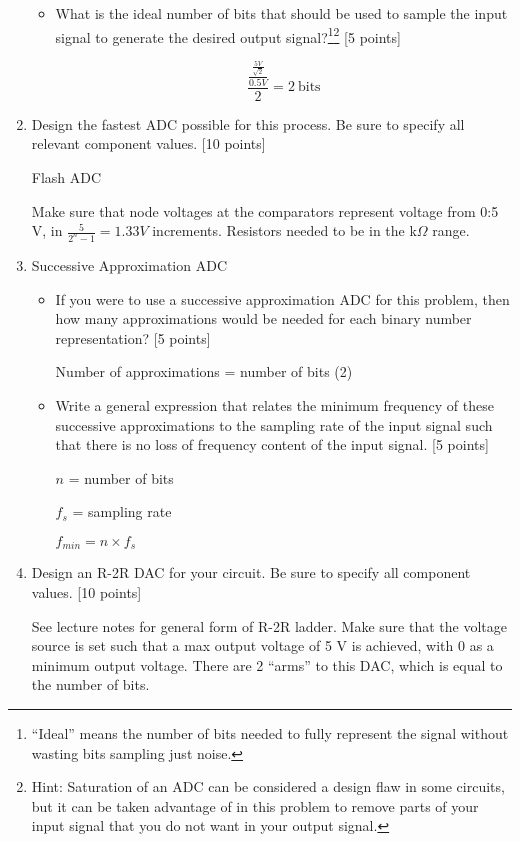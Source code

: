\begin{enumerate}
\begin{itemize}
    \item What is the ideal number of bits that should be used
to sample the input signal to generate the desired output
signal?\footnote{``Ideal'' means the number of bits needed to fully represent
the signal without wasting bits sampling just noise.}\footnote{Hint: Saturation
of an ADC can be considered a design flaw in some circuits, but it can be taken
advantage of in this problem to remove parts of your input signal that you do
not want in your output signal.} [5 points]

$$\frac{\frac{\frac{5 V}{\sqrt{2}}}{0.5 V}}{2} = 2~\textrm{bits}$$

\end{itemize}

\item Design the fastest ADC possible for this process.  Be sure to specify all
relevant component values. [10 points]

Flash ADC

Make sure that node voltages at the comparators represent voltage from 0:5 V,
in $\frac{5}{2^n -1} = 1.33 V$ increments.  Resistors needed to be in the k$\Omega$ range.

\item Successive Approximation ADC
\begin{itemize}
    \item If you were to use a successive approximation ADC for this problem, then
how many approximations would be needed for each binary number representation?  [5 points]

Number of approximations = number of bits (2)

    \item Write a general expression that relates the minimum frequency of these
successive approximations to the sampling rate of the input signal such that there is no
loss of frequency content of the input signal. [5 points]

$n$ = number of bits

$f_s$ = sampling rate

$f_{min} = n \times f_s$

\end{itemize}

\item Design an R-2R DAC for your circuit. Be sure to specify all component values.  [10 points]

See lecture notes for general form of R-2R ladder.  Make sure that the voltage source is set such that a max output voltage of 5 V is achieved, with 0 as a minimum output voltage.  There are 2 ``arms'' to this DAC, which is equal to the number of bits.


\end{enumerate}
